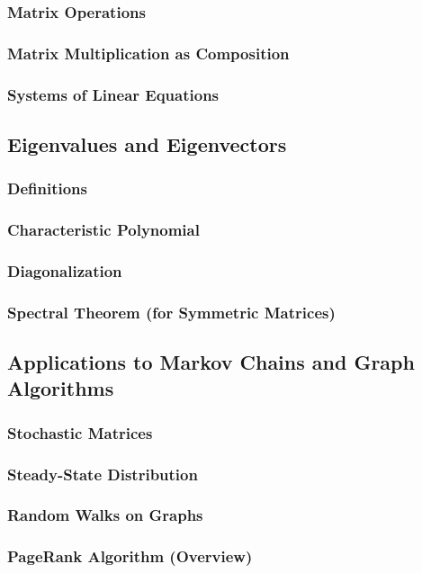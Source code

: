 \subsubsection{Matrix Operations}
\subsubsection{Matrix Multiplication as Composition}
\subsubsection{Systems of Linear Equations}

\subsection{Eigenvalues and Eigenvectors}
\subsubsection{Definitions}
\subsubsection{Characteristic Polynomial}
\subsubsection{Diagonalization}
\subsubsection{Spectral Theorem (for Symmetric Matrices)}

\subsection{Applications to Markov Chains and Graph Algorithms}
\subsubsection{Stochastic Matrices}
\subsubsection{Steady-State Distribution}
\subsubsection{Random Walks on Graphs}
\subsubsection{PageRank Algorithm (Overview)}

